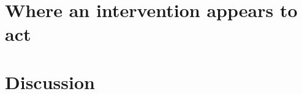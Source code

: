 \section{Where an intervention appears to act}\label{sec:claim3}                         %


\section{Discussion}\label{sec:discussion}                                              %
